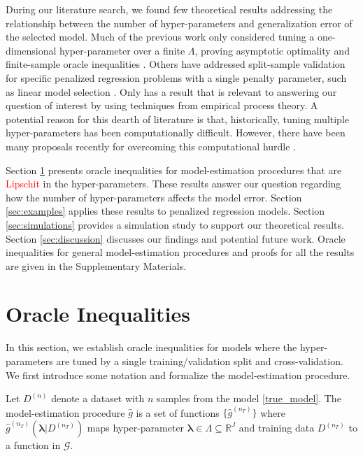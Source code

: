\documentclass[12pt]{article} %
\theoremstyle{definition}
\newcommand{\textred}[1]{\textcolor{red}{#1}}
\begin{document}
During our literature search, we found few theoretical results addressing the relationship between the number of hyper-parameters and generalization error of the selected model. 
Much of the previous work only considered tuning a one-dimensional hyper-parameter over a finite $\Lambda$, proving asymptotic optimality \citep{van2004asymptotic} and finite-sample oracle inequalities \citep{van2003unified, gyorfi2006distribution}. Others have addressed split-sample validation for specific penalized regression problems with a single penalty parameter, such as linear model selection \citep{li1987asymptotic, shao1997asymptotic, golub1979generalized, chetverikov2016cross, chatterjee2015prediction}. Only \citet{lecue2012oracle} has a result that is relevant to answering our question of interest by using techniques from empirical process theory. A potential reason for this dearth of literature is that, historically, tuning multiple hyper-parameters has been computationally difficult. However, there have been many proposals recently for overcoming this computational hurdle \citep{bengio2000gradient, foo2008efficient, snoek2012practical}.

Section \ref{sec:main_results} presents oracle inequalities for model-estimation procedures that are \textred{Lipschit} in the hyper-parameters.
These results answer our question regarding how the number of hyper-parameters affects the model error.
Section \ref{sec:examples} applies these results to penalized regression models.
Section \ref{sec:simulations} provides a simulation study to support our theoretical results.
Section \ref{sec:discussion} discusses our findings and potential future work.
Oracle inequalities for general model-estimation procedures and proofs for all the results are given in the Supplementary Materials.



\section{Oracle Inequalities} \label{sec:main_results}

In this section, we establish oracle inequalities for models where the hyper-parameters are tuned by a single training/validation split and cross-validation. We first introduce some notation and formalize the model-estimation procedure. 

Let $D^{(n)}$ denote a dataset with $n$ samples from the model \eqref{true_model}. The model-estimation procedure $\hat{g}$ is a set of functions $\{\hat{g}^{(n_T)}\}$ where $\hat{g}^{(n_T)}(\boldsymbol{\lambda} | D^{(n_T)})$ maps hyper-parameter $\boldsymbol{\lambda} \in \Lambda \subseteq \mathbb{R}^J$ and training data $D^{(n_T)}$ to a function in $\mathcal{G}$.
\end{document}
